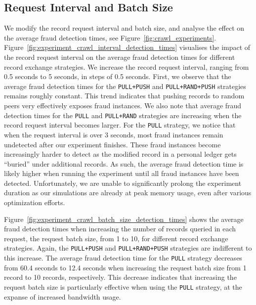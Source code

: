 \subsection{Request Interval and Batch Size}
We modify the record request interval and batch size, and analyse the effect on the average fraud detection times, see Figure~\ref{fig:crawl_experiments}.
Figure~\ref{fig:experiment_crawl_interval_detection_times} visualises the impact of the record request interval on the average fraud detection times for different record exchange strategies.
We increase the record request interval, ranging from 0.5 seconds to 5 seconds, in steps of 0.5 seconds.
First, we observe that the average fraud detection times for the \texttt{PULL+PUSH} and \texttt{PULL+RAND+PUSH} strategies remains roughly constant.
This trend indicates that pushing records to random peers very effectively exposes fraud instances.
We also note that average fraud detection times for the \texttt{PULL} and \texttt{PULL+RAND} strategies are increasing when the record request interval becomes larger.
For the \texttt{PULL} strategy, we notice that when the request interval is over 3 seconds, most fraud instances remain undetected after our experiment finishes.
These fraud instances become increasingly harder to detect as the modified record in a personal ledger gets \enquote{buried} under additional records.
As such, the average fraud detection time is likely higher when running the experiment until all fraud instances have been detected.
Unfortunately, we are unable to significantly prolong the experiment duration as our simulations are already at peak memory usage, even after various optimization efforts.

Figure~\ref{fig:experiment_crawl_batch_size_detection_times} shows the average fraud detection times when increasing the number of records queried in each request, the request batch size, from 1 to 10, for different record exchange strategies.
Again, the \texttt{PULL+PUSH} and \texttt{PULL+RAND+PUSH} strategies are indifferent to this increase.
The average fraud detection time for the \texttt{PULL} strategy decreases from 60.4 seconds to 12.4 seconds when increasing the request batch size from 1 record to 10 records, respectively.
This decrease indicates that increasing the request batch size is particularly effective when using the \texttt{PULL} strategy, at the expanse of increased bandwidth usage.

